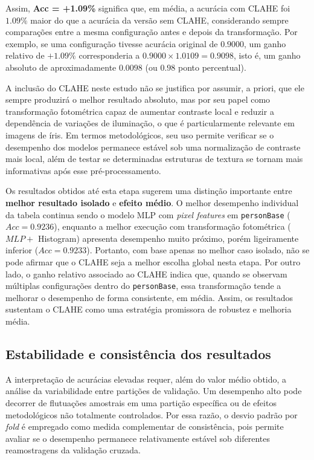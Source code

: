 \documentclass[12pt,a4paper]{article}
\begin{document}
Assim, \textbf{Acc = +1.09\%} significa que, em média, a acurácia com CLAHE foi \(1.09\%\) maior do que a acurácia da versão sem CLAHE, considerando sempre comparações entre a mesma configuração antes e depois da transformação. Por exemplo, se uma configuração tivesse acurácia original de \(0.9000\), um ganho relativo de \(+1.09\%\) corresponderia a \(0.9000 \times 1.0109 = 0.9098\), isto é, um ganho absoluto de aproximadamente \(0.0098\) (ou \(0.98\) ponto percentual).

A inclusão do CLAHE neste estudo não se justifica por assumir, a priori, que ele sempre produzirá o melhor resultado absoluto, mas por seu papel como transformação fotométrica capaz de aumentar contraste local e reduzir a dependência de variações de iluminação, o que é particularmente relevante em imagens de íris. Em termos metodológicos, seu uso permite verificar se o desempenho dos modelos permanece estável sob uma normalização de contraste mais local, além de testar se determinadas estruturas de textura se tornam mais informativas após esse pré-processamento.

Os resultados obtidos até esta etapa sugerem uma distinção importante entre \textbf{melhor resultado isolado} e \textbf{efeito médio}. O melhor desempenho individual da tabela continua sendo o modelo MLP com \textit{pixel features} em \texttt{personBase} (\(Acc = 0.9236\)), enquanto a melhor execução com transformação fotométrica (\(MLP +\) Histogram) apresenta desempenho muito próximo, porém ligeiramente inferior (\(Acc = 0.9233\)). Portanto, com base apenas no melhor caso isolado, não se pode afirmar que o CLAHE seja a melhor escolha global nesta etapa. Por outro lado, o ganho relativo associado ao CLAHE indica que, quando se observam múltiplas configurações dentro do \texttt{personBase}, essa transformação tende a melhorar o desempenho de forma consistente, em média. Assim, os resultados sustentam o CLAHE como uma estratégia promissora de robustez e melhoria média. %


\subsection{Estabilidade e consistência dos resultados}

A interpretação de acurácias elevadas requer, além do valor médio obtido, a análise da variabilidade entre partições de validação. Um desempenho alto pode decorrer de flutuações amostrais em uma partição específica ou de efeitos metodológicos não totalmente controlados. Por essa razão, o desvio padrão por \textit{fold} é empregado como medida complementar de consistência, pois permite avaliar se o desempenho permanece relativamente estável sob diferentes reamostragens da validação cruzada.
\end{document}
